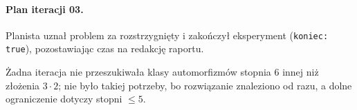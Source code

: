 \paragraph{Plan iteracji 03.} Planista uznał problem za rozstrzygnięty i zakończył eksperyment
(\texttt{koniec: true}), pozostawiając czas na redakcję raportu.

\begin{uwaga}
Żadna iteracja nie przeszukiwała klasy automorfizmów stopnia 6 innej niż złożenia $3\cdot2$; nie
było takiej potrzeby, bo rozwiązanie znaleziono od razu, a dolne ograniczenie dotyczy stopni $\le5$.
\end{uwaga}
